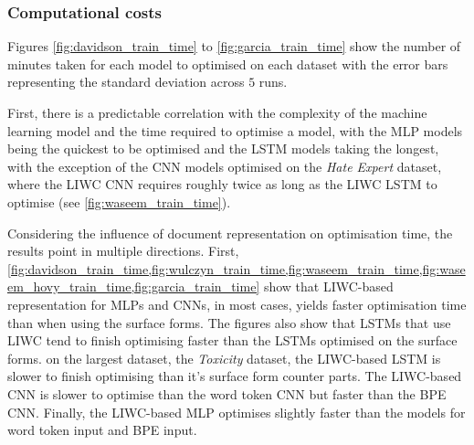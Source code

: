 \subsubsection{Computational costs}  
  
Figures \ref{fig:davidson_train_time} to \ref{fig:garcia_train_time} show the number of minutes taken for each model to optimised on each dataset with the error bars representing the standard deviation across $5$ runs.  
  
First, there is a predictable correlation with the complexity of the machine learning model and the time required to optimise a model, with the MLP models being the quickest to be optimised and the LSTM models taking the longest, with the exception of the CNN models optimised on the \textit{Hate Expert} dataset, where the LIWC CNN requires roughly twice as long as the LIWC LSTM to optimise (see \cref{fig:waseem_train_time}).  
  
Considering the influence of document representation on optimisation time, the results point in multiple directions.  
First, \cref{fig:davidson_train_time,fig:wulczyn_train_time,fig:waseem_train_time,fig:waseem_hovy_train_time,fig:garcia_train_time} show that LIWC-based representation for MLPs and CNNs, in most cases, yields faster optimisation time than when using the surface forms.  
The figures also show that LSTMs that use LIWC tend to finish optimising faster than the LSTMs optimised on the surface forms.  
 on the largest dataset, the \textit{Toxicity} dataset, the LIWC-based LSTM is slower to finish optimising than it's surface form counter parts.  
The LIWC-based CNN is slower to optimise than the word token CNN but faster than the BPE CNN.  
Finally, the LIWC-based MLP optimises slightly faster than the models for word token input and BPE input.  
  
